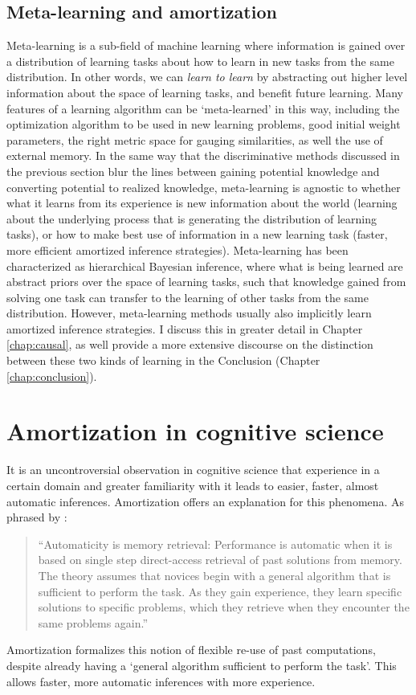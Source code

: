 \subsection{Meta-learning and amortization}
Meta-learning is a sub-field of machine learning where information is gained over a distribution of learning tasks about how to learn in new tasks from the same distribution. In other words, we can \textit{learn to learn} by abstracting out higher level information about the space of learning tasks, and benefit future learning. Many features of a learning algorithm can be `meta-learned' in this way, including the optimization algorithm to be used in new learning problems\citep{andrychowicz2016learning}, good initial weight parameters\citep{finn2017model}, the right metric space for gauging similarities\citep{vinyals2016matching}, as well the use of external memory\citep{santoro2016meta}.  In the same way that the discriminative methods discussed in the previous section blur the lines between gaining potential knowledge and converting potential to realized knowledge, meta-learning is agnostic to whether what it learns from its experience is new information about the world (learning about the underlying process that is generating the distribution of learning tasks), or how to make best use of information in a new learning task (faster, more efficient amortized inference strategies). Meta-learning has been characterized as hierarchical Bayesian inference, where what is being learned are abstract priors over the space of learning tasks, such that knowledge gained from solving one task can transfer to the learning of other tasks from the same distribution.\citep{ortega2019meta, grant2018recasting, griffiths2019doing} However, meta-learning methods usually also implicitly learn amortized inference strategies. I discuss this in greater detail in Chapter \ref{chap:causal}, as well provide a more extensive discourse on the distinction between these two kinds of learning in the Conclusion (Chapter \ref{chap:conclusion}).

\section{Amortization in cognitive science}

It is an uncontroversial observation in cognitive science that experience in a certain domain and greater familiarity with it leads to easier, faster, almost automatic inferences. Amortization offers an explanation for this phenomena. As phrased by \citet{logan1988toward}:
\begin{quote}
``Automaticity is memory retrieval: Performance is automatic when it is based on single step direct-access retrieval of past solutions from memory. The theory assumes that novices begin with a general algorithm that is sufficient to perform the task. As they gain experience, they learn specific solutions to specific problems, which they retrieve when they encounter the same problems again.''
\end{quote}
Amortization formalizes this notion of flexible re-use of past computations, despite already having a `general algorithm sufficient to perform the task'. This allows faster, more automatic inferences with more experience.

